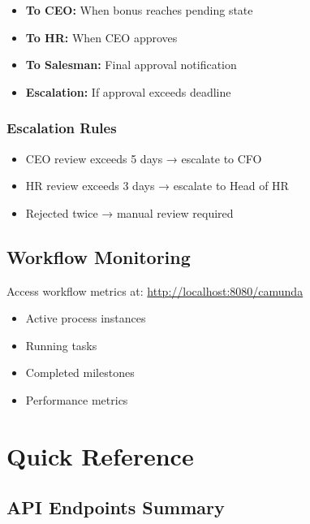 \documentclass[11pt,a4paper,oneside,openany]{book}
\begin{document}
\begin{itemize}
    \item \textbf{To CEO:} When bonus reaches pending state
    \item \textbf{To HR:} When CEO approves
    \item \textbf{To Salesman:} Final approval notification
    \item \textbf{Escalation:} If approval exceeds deadline
\end{itemize}

\subsection{Escalation Rules}

\begin{tcolorbox}[colframe=red!70, title=Escalation Triggers]
\begin{itemize}
    \item CEO review exceeds 5 days → escalate to CFO
    \item HR review exceeds 3 days → escalate to Head of HR
    \item Rejected twice → manual review required
\end{itemize}
\end{tcolorbox}

\section{Workflow Monitoring}

Access workflow metrics at: \url{http://localhost:8080/camunda}

\begin{itemize}
    \item Active process instances
    \item Running tasks
    \item Completed milestones
    \item Performance metrics
\end{itemize}

\appendix

\chapter{Quick Reference}

\section{API Endpoints Summary}
\end{document}
